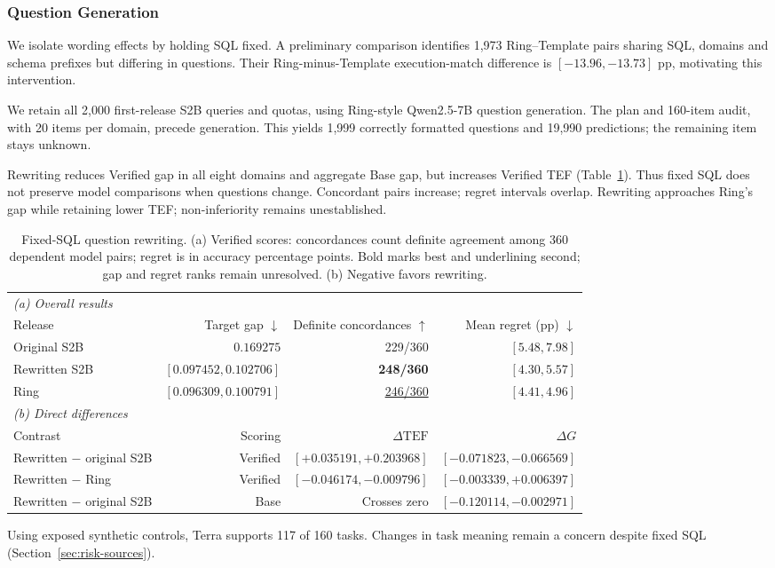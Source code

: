 \subsubsection{Question Generation}\label{sec:realization}
We isolate wording effects by holding SQL fixed. A preliminary comparison identifies 1,973 Ring--Template pairs sharing SQL, domains and schema prefixes but differing in questions. Their Ring-minus-Template execution-match difference is $[-13.96,-13.73]$ pp, motivating this intervention.

We retain all 2,000 first-release S2B queries and quotas, using Ring-style Qwen2.5-7B question generation. The plan and 160-item audit, with 20 items per domain, precede generation. This yields 1,999 correctly formatted questions and 19,990 predictions; the remaining item stays unknown.

Rewriting reduces Verified gap in all eight domains and aggregate Base gap, but increases Verified TEF (Table~\ref{tab:realization-results}). Thus fixed SQL does not preserve model comparisons when questions change. Concordant pairs increase; regret intervals overlap. Rewriting approaches Ring's gap while retaining lower TEF; non-inferiority remains unestablished.

\begin{table}[t]\centering\small
\caption{Fixed-SQL question rewriting. (a) Verified scores: concordances count definite agreement among 360 dependent model pairs; regret is in accuracy percentage points. Bold marks best and underlining second; gap and regret ranks remain unresolved. (b) Negative favors rewriting.}
\label{tab:realization-results}
\begin{tabular}{lrrr}\toprule
\multicolumn{4}{l}{\textit{(a) Overall results}}\\
Release & Target gap $\downarrow$ & Definite concordances $\uparrow$ & Mean regret (pp) $\downarrow$\\\midrule
Original S2B & $0.169275$ & 229/360 & $[5.48,7.98]$\\
Rewritten S2B & $[0.097452,0.102706]$ & \textbf{248/360} & $[4.30,5.57]$\\
Ring & $[0.096309,0.100791]$ & \underline{246/360} & $[4.41,4.96]$\\\midrule
\multicolumn{4}{l}{\textit{(b) Direct differences}}\\
Contrast & Scoring & $\Delta\mathrm{TEF}$ & $\Delta G$\\\midrule
Rewritten $-$ original S2B & Verified & $[+0.035191,+0.203968]$ & $\boldsymbol{[-0.071823,-0.066569]}$\\
Rewritten $-$ Ring & Verified & $\boldsymbol{[-0.046174,-0.009796]}$ & $[-0.003339,+0.006397]$\\
Rewritten $-$ original S2B & Base & Crosses zero & $\boldsymbol{[-0.120114,-0.002971]}$\\\bottomrule
\end{tabular}\end{table}

Using exposed synthetic controls, Terra supports 117 of 160 tasks. Changes in task meaning remain a concern despite fixed SQL (Section~\ref{sec:risk-sources}).

